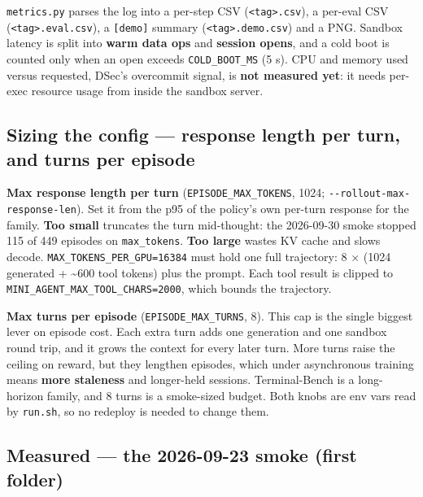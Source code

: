 \documentclass[
  paper=a4,
  ,captions=tableheading
]{scrartcl}
\begin{document}
\texttt{metrics.py} parses the log into a per-step CSV
(\texttt{\textless{}tag\textgreater{}.csv}), a per-eval CSV
(\texttt{\textless{}tag\textgreater{}.eval.csv}), a \texttt{{[}demo{]}}
summary (\texttt{\textless{}tag\textgreater{}.demo.csv}) and a PNG.
Sandbox latency is split into \textbf{warm data ops} and \textbf{session
opens}, and a cold boot is counted only when an open exceeds
\texttt{COLD\_BOOT\_MS} (5 s). CPU and memory used versus requested,
DSec's overcommit signal, is \textbf{not measured yet}: it needs
per-exec resource usage from inside the sandbox server.

\hypertarget{sizing-the-config-response-length-per-turn-and-turns-per-episode}{%
\subsection{Sizing the config --- response length per turn, and turns
per
episode}\label{sizing-the-config-response-length-per-turn-and-turns-per-episode}}

\textbf{Max response length per turn} (\texttt{EPISODE\_MAX\_TOKENS},
1024; \texttt{-\/-rollout-max-response-len}). Set it from the p95 of the
policy's own per-turn response for the family. \textbf{Too small}
truncates the turn mid-thought: the 2026-09-30 smoke stopped 115 of 449
episodes on \texttt{max\_tokens}. \textbf{Too large} wastes KV cache and
slows decode. \texttt{MAX\_TOKENS\_PER\_GPU=16384} must hold one full
trajectory: 8 × (1024 generated + \textasciitilde600 tool tokens) plus
the prompt. Each tool result is clipped to
\texttt{MINI\_AGENT\_MAX\_TOOL\_CHARS=2000}, which bounds the
trajectory.

\textbf{Max turns per episode} (\texttt{EPISODE\_MAX\_TURNS}, 8). This
cap is the single biggest lever on episode cost. Each extra turn adds
one generation and one sandbox round trip, and it grows the context for
every later turn. More turns raise the ceiling on reward, but they
lengthen episodes, which under asynchronous training means \textbf{more
staleness} and longer-held sessions. Terminal-Bench is a long-horizon
family, and 8 turns is a smoke-sized budget. Both knobs are env vars
read by \texttt{run.sh}, so no redeploy is needed to change them.

\hypertarget{measured-the-2026-09-23-smoke-first-folder}{%
\subsection{Measured --- the 2026-09-23 smoke (first
folder)}\label{measured-the-2026-09-23-smoke-first-folder}}
\end{document}
